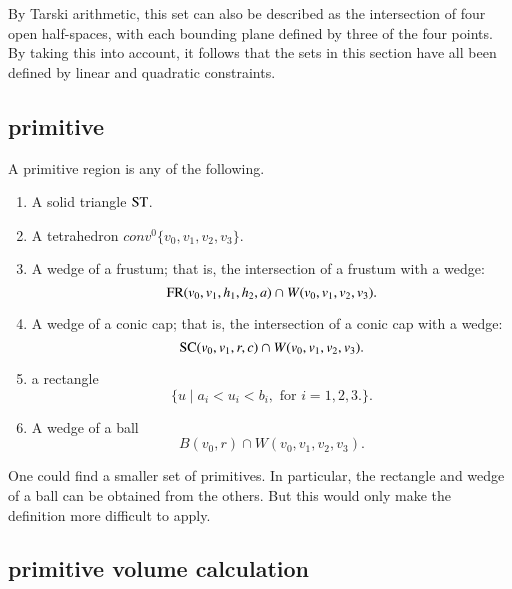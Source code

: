 By Tarski arithmetic, %
this set can also be described
as the intersection of four open half-spaces, with each bounding
plane defined by three of the four points.
By taking this into account, it follows that
the sets in this section have all been defined by linear and quadratic
constraints.

\subsection{primitive}

\begin{definition}[primitive]\label{def:primitive} 
A primitive region is any of the following.

\begin{enumerate}%
 \item A solid triangle ${\operatorname{ST}}$.
 \item A tetrahedron $conv^0\{v_0,v_1,v_2,v_3\}$.
 \item A wedge of a frustum;
that is, the intersection of a frustum with
 a wedge:
    $$
     {\operatorname{FR}}(v_0,v_1,h_1,h_2,a) \cap W(v_0,v_1,v_2,v_3).
    $$
\item A wedge of a conic cap; that is, the intersection of a conic cap
with
    a wedge:
    $$
    {\operatorname{SC}}(v_0,v_1,r,c) \cap W(v_0,v_1,v_2,v_3).
    $$
\item a rectangle
    $$
    \{u \mid a_i < u_i < b_i,\text { for } i=1,2,3.\}.
    $$
\item A wedge of a ball
  $$
  B(v_0,r) \cap W(v_0,v_1,v_2,v_3).
  $$
\end{enumerate}
One could find a smaller set of primitives.  In particular, the
rectangle and wedge of a ball can be obtained from the others.  But
this would only make the definition more difficult to apply.

\end{definition}

\subsection{primitive volume calculation}\label{sec:primitive}

